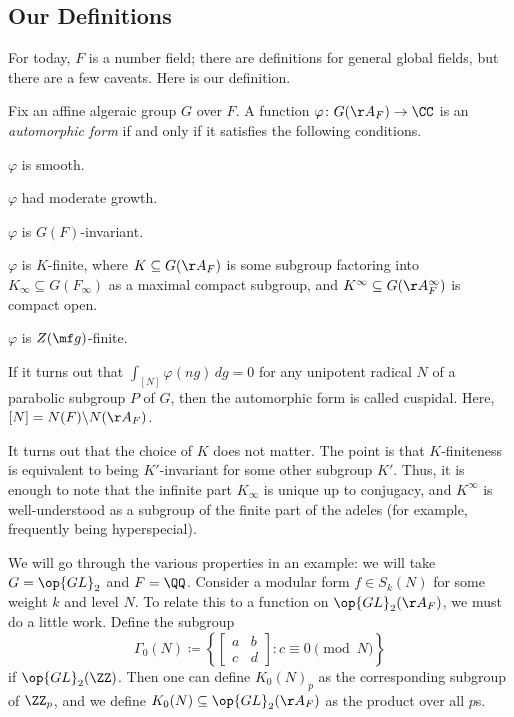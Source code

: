 \documentclass{article}
\begin{document}
\subsection{Our Definitions}
For today, $F$ is a number field; there are definitions for general global fields, but there are a few caveats. Here is our definition.
\begin{definition}
	Fix an affine algeraic group $G$ over $F$. A function $\varphi\colon G(\AA_F)\to\CC$ is an \textit{automorphic form} if and only if it satisfies the following conditions.
	\begin{listalph}
		\item $\varphi$ is smooth.
		\item $\varphi$ had moderate growth.
		\item $\varphi$ is $G(F)$-invariant.
		\item $\varphi$ is $K$-finite, where $K\subseteq G(\AA_F)$ is some subgroup factoring into $K_\infty\subseteq G(F_\infty)$ as a maximal compact subgroup, and $K^\infty\subseteq G(\AA_F^\infty)$ is compact open.
		\item $\varphi$ is $Z(\mf g)$-finite.
	\end{listalph}
\end{definition}
\begin{remark}
	If it turns out that $\int_[N]\varphi(ng)\,dg=0$ for any unipotent radical $N$ of a parabolic subgroup $P$ of $G$, then the automorphic form is called cuspidal. Here, $[N]=N(F)\backslash N(\AA_F)$.
\end{remark}
\begin{remark}
	It turns out that the choice of $K$ does not matter. The point is that $K$-finiteness is equivalent to being $K'$-invariant for some other subgroup $K'$. Thus, it is enough to note that the infinite part $K_\infty$ is unique up to conjugacy, and $K^\infty$ is well-understood as a subgroup of the finite part of the adeles (for example, frequently being hyperspecial).
\end{remark}
We will go through the various properties in an example: we will take $G=\op{GL}_2$ and $F=\QQ$. Consider a modular form $f\in S_k(N)$ for some weight $k$ and level $N$. To relate this to a function on $\op{GL}_2(\AA_F)$, we must do a little work. Define the subgroup
\[\Gamma_0(N)\coloneqq\left\{\begin{bmatrix}
	a & b \\ c & d
\end{bmatrix}:c\equiv0\pmod N\right\}\]
if $\op{GL}_2(\ZZ)$. Then one can define $K_0(N)_p$ as the corresponding subgroup of $\ZZ_p$, and we define $K_0(N)\subseteq\op{GL}_2(\AA_F)$ as the product over all $p$s.
\end{document}
